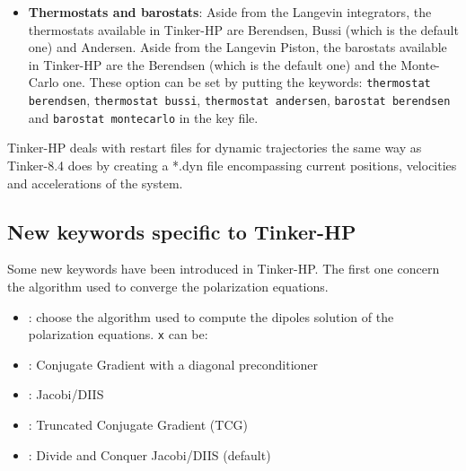 \documentclass[peerreview]{IEEEtran}
\def\respa{\textbf{\textsc{Respa}}}
\def\baoabrespa{\textbf{\textsc{BaoabRespa}}}
\def\respaone{\textbf{\textsc{Respa1}}}
\def\baoabrespaone{\textbf{\textsc{BaoabRespa1}}}
\def\baoabpiston{\textbf{\textsc{BaoabPiston}}}
\newlength{\mylen}
\begin{document}
\begin{itemize}
For \respa, \baoabrespa, \respaone\ and \baoabrespaone, the inner timestep can be imposed by the keyword \texttt{dshort x}, \texttt{x} being its desired value in  {\em ps}.

For \respaone\ and \baoabrespaone, the intermediate timestep can be imposed by the keyword \texttt{dinter x}, \texttt{x} being its desired value in  {\em ps}.

For \baoabpiston,  the mass of the piston (in atomic units) can be set by the keyword \texttt{masspiston x} and 
the friction of the piston (in  {\em ps}$^{-1}$) can be set by the keyword \texttt{frictionpiston x}.

\vskip5mm
\item \textbf{Thermostats and barostats}: Aside from the Langevin integrators, the thermostats available in Tinker-HP are Berendsen, Bussi (which is the default one) and Andersen. Aside from the Langevin Piston, the barostats available in Tinker-HP are the Berendsen (which is the default one) and the Monte-Carlo one. These option can be set by putting the keywords: \texttt{thermostat berendsen}, \texttt{thermostat bussi}, \texttt{thermostat andersen}, \texttt{barostat berendsen} and \texttt{barostat montecarlo} in the key file.
\end{itemize}

Tinker-HP deals with restart files for dynamic trajectories the same way as Tinker-8.4 does by creating a *.dyn file encompassing current positions, velocities and accelerations of the system.

\subsection{New keywords specific to Tinker-HP}
Some new keywords have been introduced in Tinker-HP. The first one concern the algorithm used to converge the polarization equations. 

\begin{itemize}
\item[] : choose  the algorithm used to compute the dipoles solution of the polarization equations. \texttt{x} can be:

    \item[] : Conjugate Gradient with a diagonal preconditioner
    \item[] : Jacobi/DIIS
    \item[] : Truncated Conjugate Gradient (TCG)
    \item[] : Divide and Conquer Jacobi/DIIS (default)

\end{itemize}
\end{document}
